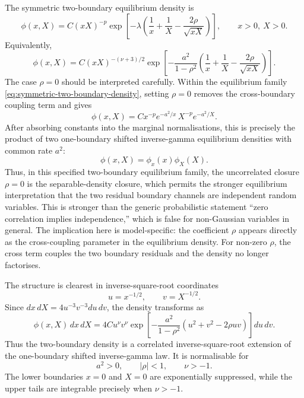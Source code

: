 \documentclass[11pt]{article}
\numberwithin{equation}{section}
\begin{document}
The symmetric two-boundary equilibrium density is
\begin{equation}
\label{eq:symmetric-two-boundary-density}
\boxed{
\phi(x,X)
=
C(xX)^{-p}
\exp\left[
-\lambda
\left(
\frac1x+
\frac1X-
\frac{2\rho}{\sqrt{xX}}
\right)
\right]
},
\qquad x>0,\ X>0 .
\end{equation}
Equivalently,
\begin{equation}
\label{eq:symmetric-two-boundary-density-expanded}
\phi(x,X)
=
C(xX)^{-(\nu+3)/2}
\exp\left[
-\frac{a^2}{1-\rho^2}
\left(
\frac1x+
\frac1X-
\frac{2\rho}{\sqrt{xX}}
\right)
\right].
\end{equation}
The case \(\rho=0\) should be interpreted carefully. Within the equilibrium family \eqref{eq:symmetric-two-boundary-density}, setting \(\rho=0\) removes the cross-boundary coupling term and gives
\begin{equation}
\label{eq:rho-zero-factorisation}
\phi(x,X)
=
C x^{-p}e^{-a^2/x}\,X^{-p}e^{-a^2/X}.
\end{equation}
After absorbing constants into the marginal normalisations, this is precisely the product of two one-boundary shifted inverse-gamma equilibrium densities with common rate \(a^2\):
\begin{equation}
\label{eq:rho-zero-independent-product}
\phi(x,X)=\phi_x(x)\phi_X(X).
\end{equation}
Thus, in this specified two-boundary equilibrium family, the uncorrelated closure \(\rho=0\) is the separable-density closure, which permits the stronger equilibrium interpretation that the two residual boundary channels are independent random variables. This is stronger than the generic probabilistic statement ``zero correlation implies independence,'' which is false for non-Gaussian variables in general. The implication here is model-specific: the coefficient \(\rho\) appears directly as the cross-coupling parameter in the equilibrium density. For non-zero \(\rho\), the cross term couples the two boundary residuals and the density no longer factorises.

The structure is clearest in inverse-square-root coordinates
\begin{equation}
\label{eq:inverse-root-coordinates}
u=x^{-1/2},
\qquad
v=X^{-1/2}.
\end{equation}
Since \(dx\,dX=4u^{-3}v^{-3}du\,dv\), the density transforms as
\begin{equation}
\label{eq:uv-density}
\phi(x,X)\,dx\,dX
=
4C u^{\nu}v^{\nu}
\exp\left[
-\frac{a^2}{1-\rho^2}
\left(u^2+v^2-2\rho uv\right)
\right]du\,dv .
\end{equation}
Thus the two-boundary density is a correlated inverse-square-root extension of the one-boundary shifted inverse-gamma law. It is normalisable for
\[
a^2>0,
\qquad
|\rho|<1,
\qquad
\nu>-1.
\]
The lower boundaries \(x=0\) and \(X=0\) are exponentially suppressed, while the upper tails are integrable precisely when \(\nu>-1\).
\end{document}
